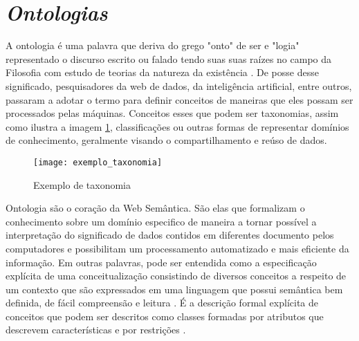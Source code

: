 


\section{\emph{Ontologias}}
\label{sec:ontologias}

A ontologia é uma palavra que deriva do grego "onto" de ser e "logia" representado o discurso escrito ou falado tendo suas suas raízes no campo da Filosofia com estudo de teorias da natureza da existência \citet{Berners-lee2001}. De posse desse significado, pesquisadores da web de dados, da inteligência artificial, entre outros, passaram a adotar o termo para definir conceitos de maneiras que eles possam ser processados pelas máquinas. Conceitos esses que podem ser taxonomias, assim como ilustra a imagem \ref{fig:exemplo_taxonomia}, classificações ou outras formas de representar domínios de conhecimento, geralmente visando o compartilhamento e reúso de dados.

\begin{figure}[!ht]
  \centering
  \texttt{[image: exemplo\_taxonomia]} 
  \caption{Exemplo de taxonomia}
  \label{fig:exemplo_taxonomia} 
\end{figure}

Ontologia são o coração da Web Semântica. São elas que formalizam o conhecimento sobre um domínio especifico de maneira a tornar possível a interpretação do significado de dados contidos em diferentes documento pelos computadores \citep{Bienvenu2013} e possibilitam um processamento automatizado e mais eficiente da informação. Em outras palavras, pode ser entendida como a especificação explícita de uma conceitualização \citep{Gruber1993} consistindo de diversos conceitos a respeito de um contexto que são expressados em uma linguagem que possui semântica bem definida, de fácil compreensão e leitura \citep{Gali2004}. É a descrição formal explícita de conceitos que podem ser descritos como classes formadas por atributos que descrevem características e por restrições \citep{Jain2011}.

